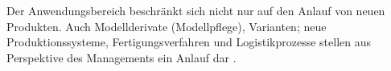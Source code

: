 Der Anwendungsbereich beschränkt sich nicht nur auf den Anlauf von neuen Produkten. Auch Modellderivate (Modellpflege), Varianten; neue Produktionssysteme, Fertigungsverfahren und Logistikprozesse stellen aus Perspektive des Managements ein Anlauf dar \cite[6]{Bischoff2007}. %




% 
%  
% 
% 
% 
% 
% 
% 
% 
% 
